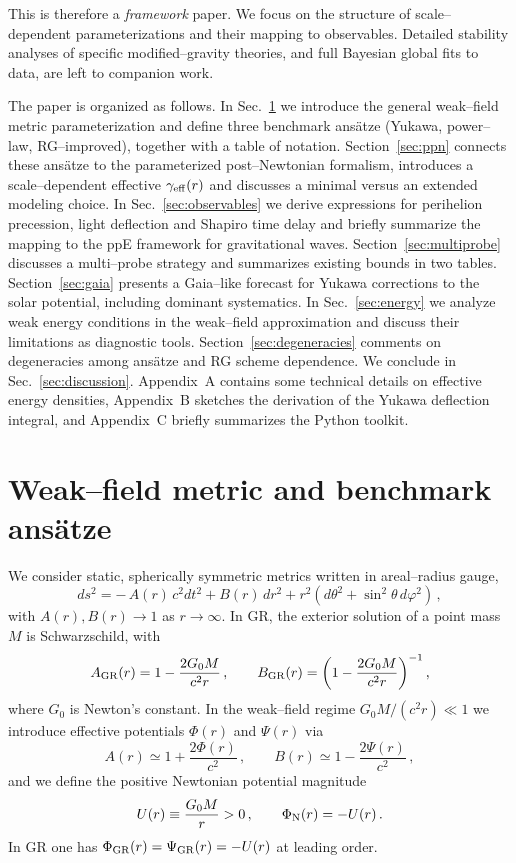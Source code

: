 \documentclass[11pt,a4paper]{article}
\begin{document}
This is therefore a \emph{framework} paper. We focus on the structure of scale--dependent parameterizations and their mapping to observables. Detailed stability analyses of specific modified--gravity theories, and full Bayesian global fits to data, are left to companion work.

The paper is organized as follows. In Sec.~\ref{sec:metric-ansatze} we introduce the general weak--field metric parameterization and define three benchmark ans\"atze (Yukawa, power--law, RG--improved), together with a table of notation. Section~\ref{sec:ppn} connects these ans\"atze to the parameterized post--Newtonian formalism, introduces a scale--dependent effective $\gamma_{\rm eff}(r)$ and discusses a minimal versus an extended modeling choice. In Sec.~\ref{sec:observables} we derive expressions for perihelion precession, light deflection and Shapiro time delay and briefly summarize the mapping to the ppE framework for gravitational waves. Section~\ref{sec:multiprobe} discusses a multi--probe strategy and summarizes existing bounds in two tables. Section~\ref{sec:gaia} presents a Gaia--like forecast for Yukawa corrections to the solar potential, including dominant systematics. In Sec.~\ref{sec:energy} we analyze weak energy conditions in the weak--field approximation and discuss their limitations as diagnostic tools. Section~\ref{sec:degeneracies} comments on degeneracies among ans\"atze and RG scheme dependence. We conclude in Sec.~\ref{sec:discussion}. Appendix~A contains some technical details on effective energy densities, Appendix~B sketches the derivation of the Yukawa deflection integral, and Appendix~C briefly summarizes the Python toolkit.

\section{Weak--field metric and benchmark ans\"atze}
\label{sec:metric-ansatze}

We consider static, spherically symmetric metrics written in areal--radius gauge,
\begin{equation}
\label{eq:metric}
ds^2 = -\,A(r)\,c^2 dt^2 + B(r)\,dr^2 + r^2(d\theta^2 + \sin^2\theta\,d\varphi^2)\,,
\end{equation}
with $A(r),B(r)\to 1$ as $r\to\infty$. In GR, the exterior solution of a point mass $M$ is Schwarzschild, with
\begin{equation}
A_{\rm GR}(r) = 1 - \frac{2G_0M}{c^2 r}\,, \qquad B_{\rm GR}(r) = \left(1 - \frac{2G_0M}{c^2 r}\right)^{-1},
\end{equation}
where $G_0$ is Newton's constant. In the weak--field regime $G_0M/(c^2r)\ll 1$ we introduce effective potentials $\Phi(r)$ and $\Psi(r)$ via
\begin{equation}
A(r) \simeq 1 + \frac{2\Phi(r)}{c^2}\,, \qquad B(r) \simeq 1 - \frac{2\Psi(r)}{c^2}\,,
\label{eq:PhiPsi-def}
\end{equation}
and we define the positive Newtonian potential magnitude
\begin{equation}
U(r) \equiv \frac{G_0 M}{r} > 0\,, \qquad \Phi_{\rm N}(r) = -U(r)\,.
\end{equation}
In GR one has $\Phi_{\rm GR}(r) = \Psi_{\rm GR}(r) = -U(r)$ at leading order.
\end{document}
